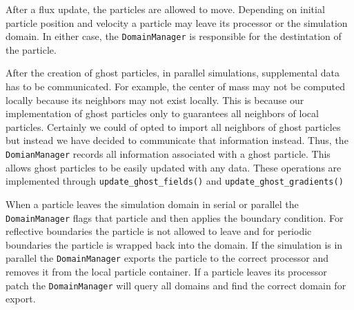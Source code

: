 After a flux update, the particles are allowed to move. Depending on initial particle position and
velocity a particle may leave its processor or the simulation domain. In either case, the 
\lstinline{DomainManager} is responsible for the destintation of the particle.

After the creation of ghost particles, in parallel simulations, supplemental data has to be communicated. 
For example, the center of mass may not be computed locally because its neighbors may not exist locally.
This is because our implementation of ghost particles only to guarantees all neighbors of local
particles. Certainly we could of opted to import all neighbors of ghost particles but instead we have 
decided to communicate that information instead. Thus, the \lstinline{DomianManager} records all information
associated with a ghost particle. This allows ghost particles to be easily updated with any data. These
operations are implemented through \lstinline{update_ghost_fields()} and 
\lstinline{update_ghost_gradients()}


When a particle leaves the simulation domain in serial or parallel the \lstinline{DomainManager}
flags that particle and then applies the boundary condition. For reflective boundaries the particle is not
allowed to leave and for periodic boundaries the particle is wrapped back into the domain. If the simulation
is in parallel the \lstinline{DomainManager} exports the particle to the correct processor and removes
it from the local particle container. If a particle leaves its processor patch the \lstinline{DomainManager}
will query all domains and find the correct domain for export.

